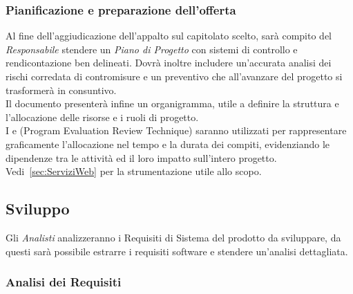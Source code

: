 \documentclass{scalatekids-article}
\begin{document}
\subsubsection{Pianificazione e preparazione dell'offerta}

Al fine dell'aggiudicazione dell'appalto sul capitolato scelto, sarà compito del
\textit{Responsabile} stendere un \textit{Piano di Progetto} con sistemi di
controllo e rendicontazione ben delineati. Dovrà inoltre includere un'accurata
analisi dei rischi corredata di contromisure e un preventivo che all'avanzare
del progetto si trasformerà in consuntivo.\\
Il documento presenterà infine un organigramma, utile a definire la struttura
e l'allocazione delle risorse e i ruoli di progetto.\\
I  e  (Program Evaluation Review
Technique) saranno utilizzati per rappresentare graficamente l'allocazione nel
tempo e la durata dei compiti, evidenziando le dipendenze tra le attività ed
il loro impatto sull'intero progetto.\\
Vedi~\ref{sec:ServiziWeb} per la strumentazione utile allo scopo.

\subsection{Sviluppo}

Gli \textit{Analisti} analizzeranno i Requisiti di Sistema del prodotto da
sviluppare, da questi sarà possibile estrarre i requisiti software e stendere un'analisi dettagliata.

\subsubsection{Analisi dei Requisiti}
\end{document}
